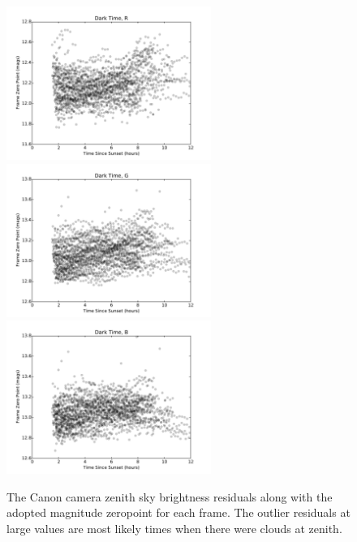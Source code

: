\documentclass[]{spie}
\begin{document}
\begin{figure}
  \includegraphics[height=5cm]{plots/zpTON_R.pdf}\includegraphics[height=5cm]{plots/zpTON_G.pdf}\includegraphics[height=5cm]{plots/zpTON_B.pdf}
  \caption{The Canon camera zenith sky brightness residuals along with the adopted magnitude zeropoint for each frame. The outlier residuals at large values are most likely times when there were clouds at zenith.  \label{fig:timeOfNight}}
\end{figure}
\end{document}
